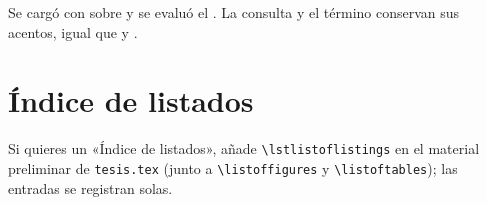 \documentclass[11pt,letterpaper]{book}
\begin{document}
Se cargó con  sobre  y se evaluó el .
La consulta  y el término  conservan sus acentos, igual
que  y .

\section{Índice de listados}

Si quieres un «Índice de listados», añade \verb|\lstlistoflistings| en el
material preliminar de \texttt{tesis.tex} (junto a \verb|\listoffigures| y
\verb|\listoftables|); las entradas se registran solas.

\lstlistoflistings
\end{document}
